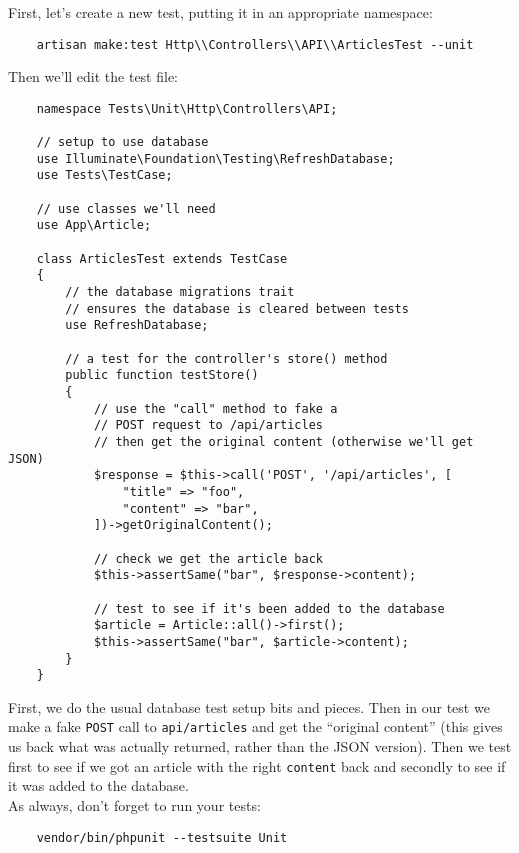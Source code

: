 First, let's create a new test, putting it in an appropriate namespace:

\begin{verbatim}
    artisan make:test Http\\Controllers\\API\\ArticlesTest --unit
\end{verbatim}

Then we'll edit the test file:

\begin{verbatim}
    namespace Tests\Unit\Http\Controllers\API;

    // setup to use database
    use Illuminate\Foundation\Testing\RefreshDatabase;
    use Tests\TestCase;

    // use classes we'll need
    use App\Article;

    class ArticlesTest extends TestCase
    {
        // the database migrations trait
        // ensures the database is cleared between tests
        use RefreshDatabase;

        // a test for the controller's store() method
        public function testStore()
        {
            // use the "call" method to fake a
            // POST request to /api/articles
            // then get the original content (otherwise we'll get JSON)
            $response = $this->call('POST', '/api/articles', [
                "title" => "foo",
                "content" => "bar",
            ])->getOriginalContent();

            // check we get the article back
            $this->assertSame("bar", $response->content);

            // test to see if it's been added to the database
            $article = Article::all()->first();
            $this->assertSame("bar", $article->content);
        }
    }
\end{verbatim}

First, we do the usual database test setup bits and pieces. Then in our test we make a fake \texttt{POST} call to \texttt{api/articles} and get the ``original content'' (this gives us back what was actually returned, rather than the JSON version). Then we test first to see if we got an article with the right \texttt{content} back and secondly to see if it was added to the database.
\\

As always, don't forget to run your tests:

\begin{verbatim}
    vendor/bin/phpunit --testsuite Unit
\end{verbatim}

